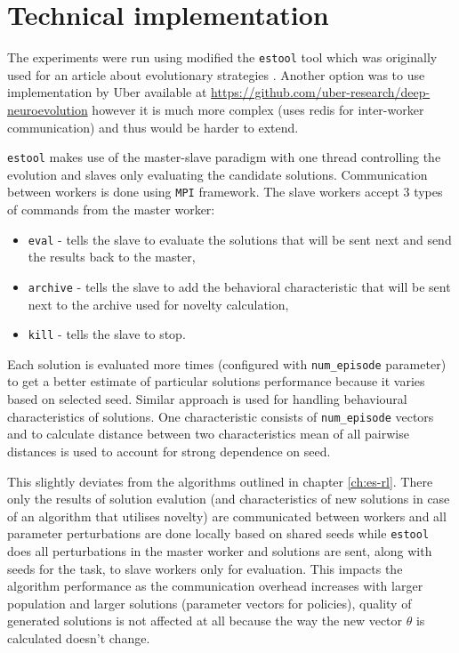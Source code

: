 \chapter{Technical implementation}

The experiments were run using modified the \texttt{estool} tool which was originally used for an article about evolutionary strategies \cite{ha2017evolving}. Another option was to use implementation by Uber available at \url{https://github.com/uber-research/deep-neuroevolution} however it is much more complex (uses redis for inter-worker communication) and thus would be harder to extend.

\texttt{estool} makes use of the master-slave paradigm with one thread controlling the evolution and slaves only evaluating the candidate solutions. Communication between workers is done using \texttt{MPI} framework. The slave workers accept 3 types of commands from the master worker: \begin{itemize}
    \item \texttt{eval} - tells the slave to evaluate the solutions that will be sent next and send the results back to the master,
    \item \texttt{archive} - tells the slave to add the behavioral characteristic that will be sent next to the archive used for novelty calculation,
    \item \texttt{kill} - tells the slave to stop.
\end{itemize}

Each solution is evaluated more times (configured with \texttt{num\_episode} parameter) to get a better estimate of particular solutions performance because it varies based on selected seed. Similar approach is used for handling behavioural characteristics of solutions. One characteristic consists of \texttt{num\_episode} vectors and to calculate distance between two characteristics mean of all pairwise distances is used to account for strong dependence on seed.

 This slightly deviates from the algorithms outlined in chapter \ref{ch:es-rl}. There only the results of solution evalution (and characteristics of new solutions in case of an algorithm that utilises novelty) are communicated between workers and all parameter perturbations are done locally based on shared seeds while \texttt{estool} does all perturbations in the master worker and solutions are sent, along with seeds for the task, to slave workers only for evaluation. This impacts the algorithm performance as the communication overhead increases with larger population and larger solutions (parameter vectors for policies), quality of generated solutions is not affected at all because the way the new vector $\theta$ is calculated doesn't change.
